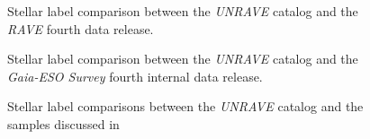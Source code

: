 \documentclass[preprint2,trackchanges]{aastex}
\newcommand{\project}[1]{\textsl{#1}}
\begin{document}
\begin{figure}[p]
\caption{Stellar label comparison between the \project{UNRAVE} catalog and the \project{RAVE} fourth data release.\label{fig:dr4-comparison}}
\end{figure}

\begin{figure}[p]
\caption{Stellar label comparison between the \project{UNRAVE} catalog and the \project{Gaia-ESO Survey} fourth internal data release.\label{fig:dr4-comparison}}
\end{figure}

\begin{figure}[p]
\caption{Stellar label comparisons between the \project{UNRAVE} catalog and the samples discussed in \citep{kordopatis_2014}}
\end{figure}
\end{document}
